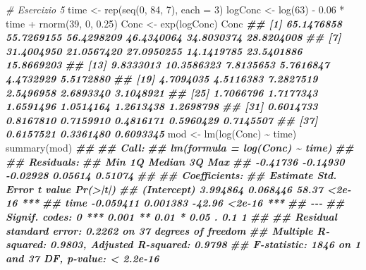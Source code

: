 \documentclass[
  12pt,
]{book}
\newenvironment{Shaded}{\begin{snugshade}}{\end{snugshade}}
\newcommand{\AttributeTok}[1]{\textcolor[rgb]{0.77,0.63,0.00}{#1}}
\newcommand{\CommentTok}[1]{\textcolor[rgb]{0.56,0.35,0.01}{\textit{#1}}}
\newcommand{\DecValTok}[1]{\textcolor[rgb]{0.00,0.00,0.81}{#1}}
\newcommand{\DocumentationTok}[1]{\textcolor[rgb]{0.56,0.35,0.01}{\textbf{\textit{#1}}}}
\newcommand{\FloatTok}[1]{\textcolor[rgb]{0.00,0.00,0.81}{#1}}
\newcommand{\FunctionTok}[1]{\textcolor[rgb]{0.00,0.00,0.00}{#1}}
\newcommand{\NormalTok}[1]{#1}
\newcommand{\OtherTok}[1]{\textcolor[rgb]{0.56,0.35,0.01}{#1}}
\newcommand{\SpecialCharTok}[1]{\textcolor[rgb]{0.00,0.00,0.00}{#1}}
\begin{document}
\begin{Shaded}
\begin{Highlighting}[]
\CommentTok{\# Esercizio 5}
\NormalTok{time }\OtherTok{\textless{}{-}} \FunctionTok{rep}\NormalTok{(}\FunctionTok{seq}\NormalTok{(}\DecValTok{0}\NormalTok{, }\DecValTok{84}\NormalTok{, }\DecValTok{7}\NormalTok{), }\AttributeTok{each =} \DecValTok{3}\NormalTok{)}
\NormalTok{logConc }\OtherTok{\textless{}{-}} \FunctionTok{log}\NormalTok{(}\DecValTok{63}\NormalTok{) }\SpecialCharTok{{-}} \FloatTok{0.06} \SpecialCharTok{*}\NormalTok{ time }\SpecialCharTok{+} \FunctionTok{rnorm}\NormalTok{(}\DecValTok{39}\NormalTok{, }\DecValTok{0}\NormalTok{, }\FloatTok{0.25}\NormalTok{)}
\NormalTok{Conc }\OtherTok{\textless{}{-}} \FunctionTok{exp}\NormalTok{(logConc)}
\NormalTok{Conc}
\DocumentationTok{\#\#  [1] 65.1476858 55.7269155 56.4298209 46.4340064 34.8030374 28.8204008}
\DocumentationTok{\#\#  [7] 31.4004950 21.0567420 27.0950255 14.1419785 23.5401886 15.8669203}
\DocumentationTok{\#\# [13]  9.8333013 10.3586323  7.8135653  5.7616847  4.4732929  5.5172880}
\DocumentationTok{\#\# [19]  4.7094035  4.5116383  7.2827519  2.5496958  2.6893340  3.1048921}
\DocumentationTok{\#\# [25]  1.7066796  1.7177343  1.6591496  1.0514164  1.2613438  1.2698798}
\DocumentationTok{\#\# [31]  0.6014733  0.8167810  0.7159910  0.4816171  0.5960429  0.7145507}
\DocumentationTok{\#\# [37]  0.6157521  0.3361480  0.6093345}
\NormalTok{mod }\OtherTok{\textless{}{-}} \FunctionTok{lm}\NormalTok{(}\FunctionTok{log}\NormalTok{(Conc) }\SpecialCharTok{\textasciitilde{}}\NormalTok{ time)}
\FunctionTok{summary}\NormalTok{(mod)}
\DocumentationTok{\#\# }
\DocumentationTok{\#\# Call:}
\DocumentationTok{\#\# lm(formula = log(Conc) \textasciitilde{} time)}
\DocumentationTok{\#\# }
\DocumentationTok{\#\# Residuals:}
\DocumentationTok{\#\#      Min       1Q   Median       3Q      Max }
\DocumentationTok{\#\# {-}0.41736 {-}0.14930 {-}0.02928  0.05614  0.51074 }
\DocumentationTok{\#\# }
\DocumentationTok{\#\# Coefficients:}
\DocumentationTok{\#\#              Estimate Std. Error t value Pr(\textgreater{}|t|)    }
\DocumentationTok{\#\# (Intercept)  3.994864   0.068446   58.37   \textless{}2e{-}16 ***}
\DocumentationTok{\#\# time        {-}0.059411   0.001383  {-}42.96   \textless{}2e{-}16 ***}
\DocumentationTok{\#\# {-}{-}{-}}
\DocumentationTok{\#\# Signif. codes:  0 \textquotesingle{}***\textquotesingle{} 0.001 \textquotesingle{}**\textquotesingle{} 0.01 \textquotesingle{}*\textquotesingle{} 0.05 \textquotesingle{}.\textquotesingle{} 0.1 \textquotesingle{} \textquotesingle{} 1}
\DocumentationTok{\#\# }
\DocumentationTok{\#\# Residual standard error: 0.2262 on 37 degrees of freedom}
\DocumentationTok{\#\# Multiple R{-}squared:  0.9803, Adjusted R{-}squared:  0.9798 }
\DocumentationTok{\#\# F{-}statistic:  1846 on 1 and 37 DF,  p{-}value: \textless{} 2.2e{-}16}
\end{Highlighting}
\end{Shaded}
\end{document}
